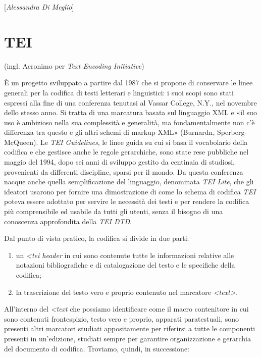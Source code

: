 \hrulefill 
 
{[}\emph{Alessandra Di Meglio}{]}




\chapter{TEI}

(ingl. Acronimo per \emph{Text Encoding Initiative})

È un progetto sviluppato a partire dal 1987 che si propone di conservare
le linee generali per la codifica di testi letterari e linguistici: i
suoi scopi sono stati espressi alla fine di una conferenza tenutasi al
Vassar College, N.Y., nel novembre dello stesso anno. Si tratta di una
marcatura basata sul linguaggio XML e «il suo uso è ambizioso nella sua
complessità e generalità, ma fondamentalmente non c'è differenza tra
questo e gli altri schemi di markup XML» (Burnardn, Sperberg-McQueen).
Le \emph{TEI Guidelines}, le linee guida su cui si basa il vocabolario
della codifica e che gestisce anche le regole gerarchiche, sono state
rese pubbliche nel maggio del 1994, dopo sei anni di sviluppo gestito da
centinaia di studiosi, provenienti da differenti discipline, sparsi per
il mondo. Da questa conferenza nacque anche quella semplificazione del
linguaggio, denominata \emph{TEI Lite}, che gli ideatori usarono per
fornire una dimostrazione di come lo schema di codifica \emph{TEI}
poteva essere adottato per servire le necessità dei testi e per rendere
la codifica più comprensibile ed usabile da tutti gli utenti, senza il
bisogno di una conoscenza approfondita della \emph{TEI DTD}.

Dal punto di vista pratico, la codifica si divide in due parti:

\begin{enumerate}
\def\labelenumi{\arabic{enumi}.}
\item
  un \emph{\textless{}tei header} in cui sono contenute
  tutte le informazioni relative alle notazioni bibliografiche e di
  catalogazione del testo e le specifiche della codifica;
\item
  la trascrizione del testo vero e proprio contenuto nel marcatore
  \emph{\textless{}text\textgreater{}.}
\end{enumerate}

All'interno del \emph{\textless{}text} che possiamo
identificare come il macro contenitore in cui sono contenuti
frontespizio, testo vero e proprio, apparati paratestuali, sono presenti
altri marcatori studiati appositamente per riferirsi a tutte le
componenti presenti in un'edizione, studiati sempre per garantire
organizzazione e gerarchia del documento di codifica. Troviamo, quindi,
in successione:

